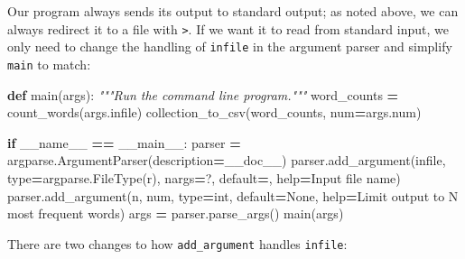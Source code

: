 \documentclass[
]{krantz}
\makeatletter
\newenvironment{Shaded}{\begin{snugshade}}{\end{snugshade}}
\newcommand{\BuiltInTok}[1]{#1}
\newcommand{\CommentTok}[1]{\textcolor[rgb]{0.56,0.35,0.01}{\textit{#1}}}
\newcommand{\ControlFlowTok}[1]{\textcolor[rgb]{0.13,0.29,0.53}{\textbf{#1}}}
\newcommand{\KeywordTok}[1]{\textcolor[rgb]{0.13,0.29,0.53}{\textbf{#1}}}
\newcommand{\NormalTok}[1]{#1}
\newcommand{\OperatorTok}[1]{\textcolor[rgb]{0.81,0.36,0.00}{\textbf{#1}}}
\newcommand{\StringTok}[1]{\textcolor[rgb]{0.31,0.60,0.02}{#1}}
\newcommand{\VariableTok}[1]{\textcolor[rgb]{0.00,0.00,0.00}{#1}}
\newenvironment{kframe}{%
\medskip{}
\setlength{\fboxsep}{.8em}
 \def\at@end@of@kframe{}%
 \ifinner\ifhmode%
  \def\at@end@of@kframe{\end{minipage}}%
  \begin{minipage}{\columnwidth}%
 \fi\fi%
 \def\FrameCommand##1{\hskip\@totalleftmargin \hskip-\fboxsep
 \colorbox{shadecolor}{##1}\hskip-\fboxsep
     \hskip-\linewidth \hskip-\@totalleftmargin \hskip\columnwidth}%
 \MakeFramed {\advance\hsize-\width
   \@totalleftmargin\z@ \linewidth\hsize
   \@setminipage}}%
 {\par\unskip\endMakeFramed%
 \at@end@of@kframe}
\renewenvironment{Shaded}{\begin{kframe}}{\end{kframe}}
\makeatother
\begin{document}
Our program always sends its output to standard output;
as noted above,
we can always redirect it to a file with \texttt{\textgreater{}}.
If we want it to read from standard input,
we only need to change the handling of \texttt{infile} in the argument parser
and simplify \texttt{main} to match:

\begin{Shaded}
\begin{Highlighting}[]
\KeywordTok{def}\NormalTok{ main(args):}
    \CommentTok{"""Run the command line program."""}
\NormalTok{    word\_counts }\OperatorTok{=}\NormalTok{ count\_words(args.infile)}
\NormalTok{    collection\_to\_csv(word\_counts, num}\OperatorTok{=}\NormalTok{args.num)}


\ControlFlowTok{if} \VariableTok{\_\_name\_\_} \OperatorTok{==} \StringTok{\textquotesingle{}\_\_main\_\_\textquotesingle{}}\NormalTok{:}
\NormalTok{    parser }\OperatorTok{=}\NormalTok{ argparse.ArgumentParser(description}\OperatorTok{=}\NormalTok{\_\_doc\_\_)}
\NormalTok{    parser.add\_argument(}\StringTok{\textquotesingle{}infile\textquotesingle{}}\NormalTok{, }\BuiltInTok{type}\OperatorTok{=}\NormalTok{argparse.FileType(}\StringTok{\textquotesingle{}r\textquotesingle{}}\NormalTok{), nargs}\OperatorTok{=}\StringTok{\textquotesingle{}?\textquotesingle{}}\NormalTok{,}
\NormalTok{                        default}\OperatorTok{=}\StringTok{\textquotesingle{}{-}\textquotesingle{}}\NormalTok{, }\BuiltInTok{help}\OperatorTok{=}\StringTok{\textquotesingle{}Input file name\textquotesingle{}}\NormalTok{)}
\NormalTok{    parser.add\_argument(}\StringTok{\textquotesingle{}{-}n\textquotesingle{}}\NormalTok{, }\StringTok{\textquotesingle{}{-}{-}num\textquotesingle{}}\NormalTok{, }\BuiltInTok{type}\OperatorTok{=}\BuiltInTok{int}\NormalTok{, default}\OperatorTok{=}\VariableTok{None}\NormalTok{,}
                        \BuiltInTok{help}\OperatorTok{=}\StringTok{\textquotesingle{}Limit output to N most frequent words\textquotesingle{}}\NormalTok{)}
\NormalTok{    args }\OperatorTok{=}\NormalTok{ parser.parse\_args()}
\NormalTok{    main(args)}
\end{Highlighting}
\end{Shaded}

There are two changes to how \texttt{add\_argument} handles \texttt{infile}:
\end{document}
